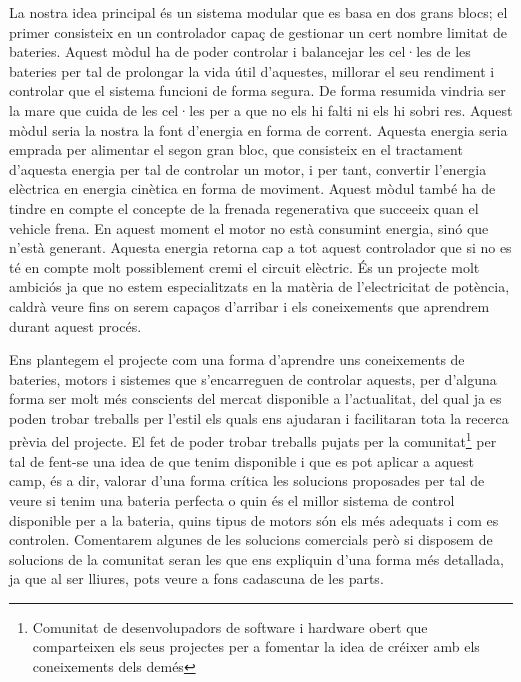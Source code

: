La nostra idea principal és un sistema modular que es basa en dos grans blocs; el primer consisteix en un controlador capaç de gestionar un cert nombre limitat de bateries. Aquest mòdul ha de poder controlar i balancejar les cel·les de les bateries per tal de prolongar la vida útil d'aquestes, millorar el seu rendiment i controlar que el sistema funcioni de forma segura. De forma resumida vindria ser la mare que cuida de les cel·les per a que no els hi falti ni els hi sobri res. Aquest mòdul seria la nostra la font d'energia en forma de corrent.  Aquesta energia seria emprada per alimentar el segon gran bloc, que consisteix en el tractament d'aquesta energia per tal de controlar un motor, i per tant, convertir l'energia elèctrica en energia cinètica en forma de moviment. Aquest mòdul també ha de tindre en compte el concepte de la frenada regenerativa que succeeix quan el vehicle frena. En aquest moment el motor no està consumint energia, sinó que n'està generant. Aquesta energia retorna cap a tot aquest controlador que si no es té en compte molt possiblement cremi el circuit elèctric. És un projecte molt ambiciós ja que no estem especialitzats en la matèria de l'electricitat de potència, caldrà veure fins on serem capaços d'arribar i els coneixements que aprendrem durant aquest procés.

Ens plantegem el projecte com una forma d'aprendre uns \newline coneixements de bateries, motors i sistemes que s'encarreguen de controlar aquests, per d'alguna forma ser molt més conscients del mercat disponible a l'actualitat, del qual ja es poden trobar treballs per l'estil els quals ens ajudaran i facilitaran tota la recerca prèvia del projecte. El fet de poder trobar treballs pujats per la comunitat\footnote{Comunitat de desenvolupadors de software i hardware obert que comparteixen els seus projectes per a fomentar la idea de créixer amb els coneixements dels demés} per tal de fent-se una idea de que tenim disponible i que es pot aplicar a aquest camp, és a dir, valorar d'una forma crítica les solucions proposades per tal de veure si tenim una bateria perfecta o quin és el millor sistema de control disponible per a la bateria, quins tipus de motors són els més adequats i com es controlen. Comentarem algunes de les solucions comercials però si disposem de solucions de la comunitat seran les que ens expliquin d'una forma més detallada, ja que al ser lliures, pots veure a fons cadascuna de les parts.

